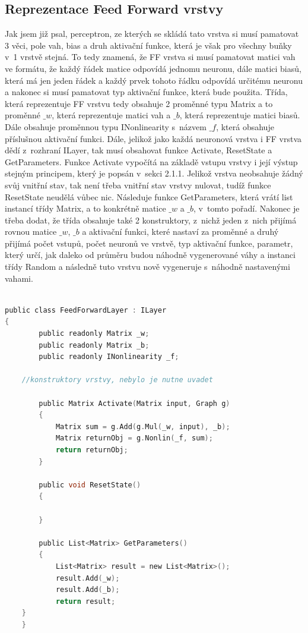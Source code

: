 \documentclass[a4paper]{article}
\begin{document}
\subsection{Reprezentace Feed Forward vrstvy}
Jak jsem již psal, perceptron, ze kterých se skládá tato vrstva si musí pamatovat 3 věci, pole vah, bias a druh aktivační funkce, která je však pro všechny buňky v~1 vrstvě stejná. To tedy znamená, že FF vrstva si musí pamatovat matici vah ve formátu, že každý řádek matice odpovídá jednomu neuronu, dále matici biasů, která má jen jeden řádek a každý prvek tohoto řádku odpovídá určitému neuronu a nakonec si musí pamatovat typ aktivační funkce, která bude použita. Třída, která reprezentuje FF vrstvu tedy obsahuje 2 proměnné typu Matrix a to proměnné $\_w$, která reprezentuje matici vah a $\_b$, která reprezentuje matici biasů. Dále obsahuje proměnnou typu INonlinearity s~názvem $\_f$, která obsahuje příslušnou aktivační funkci. Dále, jelikož jako každá neuronová vrstva i FF vrstva dědí z~rozhraní ILayer, tak musí obsahovat funkce Activate, ResetState a GetParameters. Funkce Activate vypočítá na základě vstupu vrstvy i její výstup stejným principem, který je popsán v~sekci 2.1.1. Jelikož vrstva neobsahuje žádný svůj vnitřní stav, tak není třeba vnitřní stav vrstvy nulovat, tudíž funkce ResetState neudělá vůbec nic. Následuje funkce GetParameters, která vrátí list instancí třídy Matrix, a to konkrétně matice $\_w$ a $\_b$, v~tomto pořadí. Nakonec je třeba dodat, že třída obsahuje také 2 konstruktory, z~nichž jeden z~nich přijímá rovnou matice $\_w$, $\_b$ a aktivační funkci, které nastaví za proměnné a druhý přijímá počet vstupů, počet neuronů ve vrstvě, typ aktivační funkce, parametr, který určí, jak daleko od průměru budou náhodně vygenerované váhy a instanci třídy Random a následně tuto vrstvu nově vygeneruje s~náhodně nastavenými vahami.
\begin{lstlisting}[language=C, title={Ukázka třídy FeedForwardLayer}]

public class FeedForwardLayer : ILayer
{
        public readonly Matrix _w;
        public readonly Matrix _b;
        public readonly INonlinearity _f;

	//konstruktory vrstvy, nebylo je nutne uvadet

        public Matrix Activate(Matrix input, Graph g)
        {
            Matrix sum = g.Add(g.Mul(_w, input), _b);
            Matrix returnObj = g.Nonlin(_f, sum);
            return returnObj;
        }

        public void ResetState()
        {

        }

        public List<Matrix> GetParameters()
        {
            List<Matrix> result = new List<Matrix>();
            result.Add(_w);
            result.Add(_b);
            return result;
	}
    }

\end{lstlisting}
\end{document}
